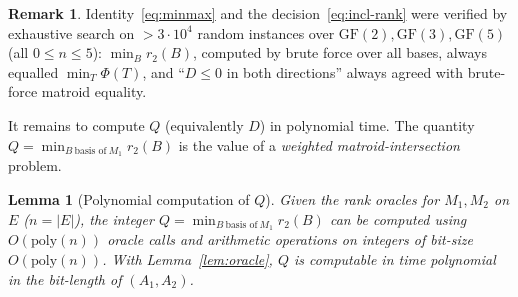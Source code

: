 \documentclass{amsart}
\theoremstyle{plain}
\newtheorem{lemma}{Lemma}
\theoremstyle{definition}
\newtheorem{remark}{Remark}
\begin{document}
\begin{remark}
Identity~\eqref{eq:minmax} and the decision~\eqref{eq:incl-rank} were verified by exhaustive
search on $>3\cdot10^4$ random instances over $\mathrm{GF}(2),\mathrm{GF}(3),\mathrm{GF}(5)$
(all $0\le n\le5$): $\min_B r_2(B)$, computed by brute force over all bases, always equalled
$\min_T\Phi(T)$, and ``$D\le0$ in both directions'' always agreed with brute-force matroid
equality.
\end{remark}

It remains to compute $Q$ (equivalently $D$) in polynomial time. The quantity
$Q=\min_{B\ \text{basis of}\ M_1}r_2(B)$ is the value of a \emph{weighted matroid-intersection}
problem.

\begin{lemma}[Polynomial computation of $Q$]\label{lem:wmi}
Given the rank oracles for $M_1,M_2$ on $E$ ($n=|E|$), the integer $Q=\min_{B\ \text{basis of}\
M_1}r_2(B)$ can be computed using $O(\mathrm{poly}(n))$ oracle calls and arithmetic operations on
integers of bit-size $O(\mathrm{poly}(n))$. With Lemma~\ref{lem:oracle}, $Q$ is computable in time
polynomial in the bit-length of $(A_1,A_2)$.
\end{lemma}
\end{document}
